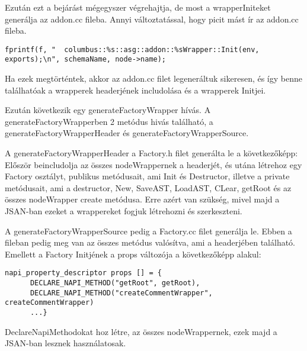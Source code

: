 Ezután ezt a bejárást mégegyszer végrehajtja, de most a wrapperIniteket generálja az addon.cc fileba.
Annyi változtatással, hogy picit mást ír az addon.cc fileba.
\begin{lstlisting}[caption={generateWrapInit leimplementálása}, label={lst:addoncc_wrapper_inits_implementation}, language={CStyle}]
fprintf(f, "  columbus::%s::asg::addon::%sWrapper::Init(env, exports);\n", schemaName, node->name);
\end{lstlisting}

Ha ezek megtörténtek, akkor az addon.cc filet legeneráltuk sikeresen, és így benne találhatóak a wrapperek headerjének includolása és a wrapperek Initjei.

\noindent

Ezután következik egy generateFactoryWrapper hívás.
A generateFactoryWrapperben 2 metódus hivás található, a generateFactoryWrapperHeader és generateFactoryWrapperSource.

\noindent

A generateFactoryWrapperHeader a Factory.h filet generálta le a következőképp:
Először beincludolja az összes nodeWrappernek a headerjét, és utána létrehoz egy Factory osztályt, publikus metódusait, ami Init és Destructor, illetve a private metódusait,
ami a destructor, New, SaveAST, LoadAST, CLear, getRoot és az összes nodeWrapper create metódusa.
Erre azért van szükség, mivel majd a JSAN-ban ezeket a wrappereket fogjuk létrehozni és szerkeszteni.

\noindent

A generateFactoryWrapperSource pedig a Factory.cc filet generálja le.
Ebben a fileban pedig meg van az összes metódus valósítva, ami a headerjében található.
Emellett a Factory Initjének a props változója a következőképp alakul:
\begin{lstlisting}[caption={Factory.cc file}, label={factory_cc}, language={CStyle}]
napi_property_descriptor props [] = {
      DECLARE_NAPI_METHOD("getRoot", getRoot),
      DECLARE_NAPI_METHOD("createCommentWrapper", createCommentWrapper)
      ...}
\end{lstlisting}
DeclareNapiMethodokat hoz létre, az összes nodeWrappernek, ezek majd a JSAN-ban lesznek használatosak.

\noindent

